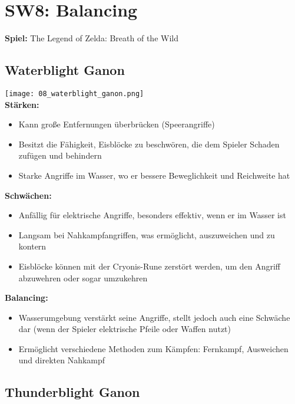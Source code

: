 \documentclass{article}
\begin{document}
\section{SW8: Balancing}

\textbf{Spiel:} The Legend of Zelda: Breath of the Wild

\subsection{Waterblight Ganon}

\texttt{[image: 08\_waterblight\_ganon.png]}
\\
\textbf{Stärken:}
\begin{itemize}
    \item Kann große Entfernungen überbrücken (Speerangriffe)
    \item Besitzt die Fähigkeit, Eisblöcke zu beschwören, die dem Spieler Schaden zufügen und behindern
    \item Starke Angriffe im Wasser, wo er bessere Beweglichkeit und Reichweite hat
\end{itemize}
\bigskip
\textbf{Schwächen:}
\begin{itemize}
    \item Anfällig für elektrische Angriffe, besonders effektiv, wenn er im Wasser ist
    \item Langsam bei Nahkampfangriffen, was ermöglicht, auszuweichen und zu kontern
    \item Eisblöcke können mit der Cryonis-Rune zerstört werden, um den Angriff abzuwehren oder sogar umzukehren
\end{itemize}
\bigskip
\textbf{Balancing:}
\begin{itemize}
    \item Wasserumgebung verstärkt seine Angriffe, stellt jedoch auch eine Schwäche dar (wenn der Spieler elektrische Pfeile oder Waffen nutzt)
    \item Ermöglicht verschiedene Methoden zum Kämpfen: Fernkampf, Ausweichen und direkten Nahkampf
\end{itemize}

\subsection{Thunderblight  Ganon}
\end{document}
